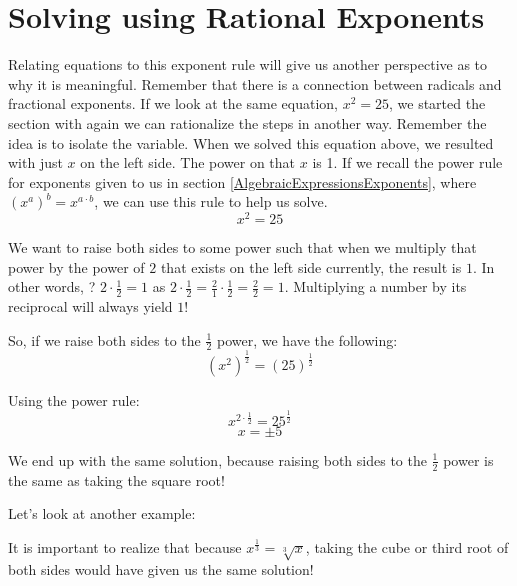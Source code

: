 \section{Solving using Rational Exponents}

Relating equations to this exponent rule will give us another perspective as to why it is meaningful. Remember that there is a connection between radicals and fractional exponents.   If we look at the same equation, $x^2=25$, we started the section with again we can rationalize the steps in another way. Remember the idea is to isolate the variable. When we solved this equation above, we resulted with just $x$ on the left side. The power on that  $x$ is 1. If we recall the power rule for exponents given to us in section \ref{AlgebraicExpressionsExponents}, where $(x^a)^b = x^{a \cdot b}$, we can use this rule to help us solve.
$$x^2 = 25$$

We want to raise both sides to some power such that when we multiply that power by the power of $2$ that exists on the left side currently, the result is $1$. In other words, ? $2 \cdot \frac{1}{2} = 1$ as $2 \cdot \frac{1}{2} = \frac{2}{1} \cdot \frac{1}{2} = \frac{2}{2}= 1$. Multiplying a number by its reciprocal will always yield $1$!

So, if we raise both sides to the $\frac{1}{2}$ power, we have the following:
$${(x^2)}^{\frac{1}{2}} = (25)^{\frac{1}{2}}$$

Using the power rule:
$$x^{2 \cdot \frac{1}{2}} = 25^{\frac{1}{2}}$$
$$x = \pm 5$$

We end up with the same solution, because raising both sides to the $\frac{1}{2}$ power is the same as taking the square root!

Let’s look at another example:



It is important to realize that because $x^{\frac{1}{3}}=\sqrt[3]{x}$, taking the cube or third root of both sides would have given us the same solution!

